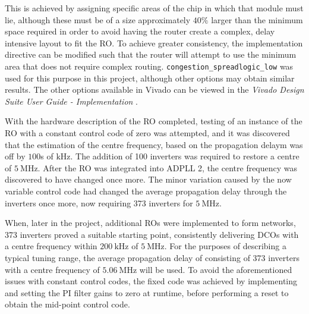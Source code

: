 This is achieved by assigning specific areas of the chip in which that module must lie, although these must be of a size approximately $40\%$ larger than the minimum space required in order to avoid having the router create a complex, delay intensive layout to fit the \ac{RO}. To achieve greater consistency, the implementation directive can be modified such that the router will attempt to use the minimum area that does not require complex routing. \texttt{congestion\_spreadlogic\_low} was used for this purpose in this project, although other options may obtain similar results. The other options available in Vivado can be viewed in the \textit{Vivado Design Suite User Guide - Implementation} \cite{impl_ug}.

With the hardware description of the \ac{RO} completed, testing of an instance of the \ac{RO} with a constant control code of zero was attempted, and it was discovered that the estimation of the centre frequency, based on the propagation delaym was off by $100$s of $\si{\kilo\hertz}$. The addition of 100 inverters was required to restore a centre of $5~\si{\mega\hertz}$. After the \ac{RO} was integrated into \ac{ADPLL} 2, the centre frequency was discovered to have changed once more. The minor variation caused by the now variable control code had changed the average propagation delay through the inverters once more, now requiring 373 inverters for $5~\si{\mega\hertz}$.

When, later in the project, additional \acp{RO} were implemented to form networks, 373 inverters proved a suitable starting point, consistently delivering \acp{DCO} with a centre frequency within $200~\si{\kilo\hertz}$ of $5~\si{\mega\hertz}$. For the purposes of describing a typical tuning range, the average propagation delay of  consisting of 373 inverters with a centre frequency of $5.06~\si{\mega\hertz}$ will be used. To avoid the aforementioned issues with constant control codes, the fixed code was achieved by implementing  and setting the \ac{PI} filter gains to zero at runtime, before performing a reset to obtain the mid-point control code.


